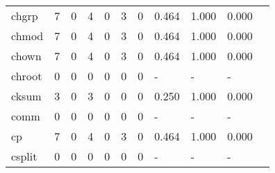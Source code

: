 \begin{longtable}{lp{1.10cm}p{1.10cm}p{1.10cm}p{1.10cm}p{1.10cm}p{1.10cm}p{1.10cm}p{1.10cm}p{1.10cm}p{1.10cm}}
chgrp     &                      7 &                                  0 &                                 4 &                                0 &                                 3 &                               0 &                          0.464 &                                 1.000 &                               0.000 \\
chmod     &                      7 &                                  0 &                                 4 &                                0 &                                 3 &                               0 &                          0.464 &                                 1.000 &                               0.000 \\
chown     &                      7 &                                  0 &                                 4 &                                0 &                                 3 &                               0 &                          0.464 &                                 1.000 &                               0.000 \\
chroot    &                      0 &                                  0 &                                 0 &                                0 &                                 0 &                               0 &                              - &                                     - &                                   - \\
cksum     &                      3 &                                  0 &                                 3 &                                0 &                                 0 &                               0 &                          0.250 &                                 1.000 &                               0.000 \\
comm      &                      0 &                                  0 &                                 0 &                                0 &                                 0 &                               0 &                              - &                                     - &                                   - \\
cp        &                      7 &                                  0 &                                 4 &                                0 &                                 3 &                               0 &                          0.464 &                                 1.000 &                               0.000 \\
csplit    &                      0 &                                  0 &                                 0 &                                0 &                                 0 &                               0 &                              - &                                     - &                                   - \\

\end{longtable}
